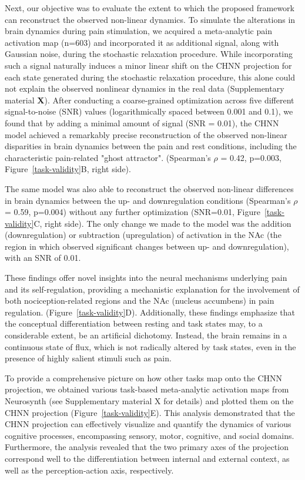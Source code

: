 \documentclass{article}
\begin{document}
Next, our objective was to evaluate the extent to which the proposed framework can reconstruct the observed non-linear
dynamics. To simulate the alterations in brain dynamics during pain stimulation, we acquired a meta-analytic pain
activation map \citep{zunhammer2021meta} (n=603) and incorporated it as additional signal, along with Gaussian noise,
during the stochastic relaxation procedure. While incorporating such a signal naturally induces a minor linear shift
on the CHNN projection for each state generated during the stochastic relaxation procedure, this alone could not explain
the observed nonlinear dynamics in the real data (Supplementary material \textbf{X}). After conducting a
coarse-grained optimization across five different signal-to-noise (SNR) values (logarithmically spaced between
0.001 and 0.1), we found that by adding a minimal amount of signal (SNR = 0.01), the CHNN model achieved a remarkably
precise reconstruction of the observed non-linear disparities in brain dynamics between the pain and rest conditions,
including the characteristic pain-related "ghost attractor". (Spearman's $\rho$ = 0.42, p=0.003,
Figure~\ref{task-validity}B, right side).

The same model was also able to reconstruct the observed non-linear differences in brain dynamics between the up- and
downregulation conditions (Spearman's $\rho$ = 0.59, p=0.004) without any further optimization (SNR=0.01,
Figure~\ref{task-validity}C, right side). The only change we made to the model was the addition (downregulation) or
subtraction (upregulation) of activation in the NAc (the region in which \citep{woo2015distinct} observed significant
changes between up- and downregulation), with an SNR of 0.01.

These findings offer novel insights into the neural mechanisms underlying pain and its self-regulation, providing a
mechanistic explanation for the involvement of both nociception-related regions and the NAc (nucleus accumbens) in pain
regulation. (Figure~\ref{task-validity}D). Additionally, these findings emphasize that the conceptual differentiation
between resting and task states may, to a considerable extent, be an artificial dichotomy. Instead, the brain remains
in a continuous state of flux, which is not radically altered by task states, even in the presence of highly salient
stimuli such as pain.


To provide a comprehensive picture on how other tasks map onto the CHNN projection, we obtained various task-based
meta-analytic activation maps from Neurosynth (see Supplementary material X for details) and plotted them on the
CHNN projection (Figure~\ref{task-validity}E). This analysis demonstrated that the CHNN projection can effectively
visualize and quantify the dynamics of various cognitive processes, encompassing sensory, motor, cognitive, and social
domains. Furthermore, the analysis revealed that the two primary axes of the projection correspond well to the
differentiation between internal and external context, as well as the perception-action axis, respectively.
\end{document}
